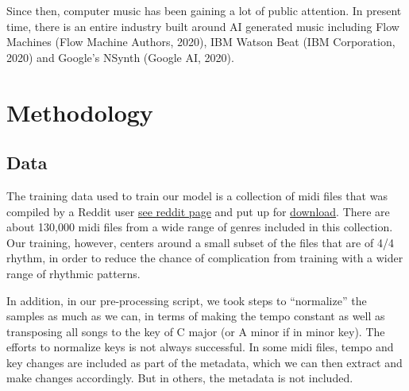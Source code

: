 \documentclass[12pt,oneside]{chicagocapstone}
\begin{document}
Since then, computer music has been gaining a lot of public attention. In present time, there is an entire industry built around AI generated music including Flow Machines (Flow Machine Authors, 2020), IBM Watson Beat (IBM Corporation, 2020) and Google's NSynth (Google AI, 2020).

\newpage

\hypertarget{methodology}{%
\chapter*{Methodology}\label{methodology}}

\hypertarget{methodology-data}{%
\section*{Data}\label{methodology-data}}

The training data used to train our model is a collection of midi files that was compiled by a Reddit user \href{https://www.reddit.com/r/WeAreTheMusicMakers/comments/3ajwe4/the_largest_midi_collection_on_the_internet/}{see reddit page} and put up for \href{https://mega.co.nz/\#!Elg1TA7T!MXEZPzq9s9YObiUcMCoNQJmCbawZqzAkHzY4Ym6Gs_Q}{download}. There are about 130,000 midi files from a wide range of genres included in this collection. Our training, however, centers around a small subset of the files that are of 4/4 rhythm, in order to reduce the chance of complication from training with a wider range of rhythmic patterns.

In addition, in our pre-processing script, we took steps to ``normalize'' the samples as much as we can, in terms of making the tempo constant as well as transposing all songs to the key of C major (or A minor if in minor key). The efforts to normalize keys is not always successful. In some midi files, tempo and key changes are included as part of the metadata, which we can then extract and make changes accordingly. But in others, the metadata is not included.
\end{document}

